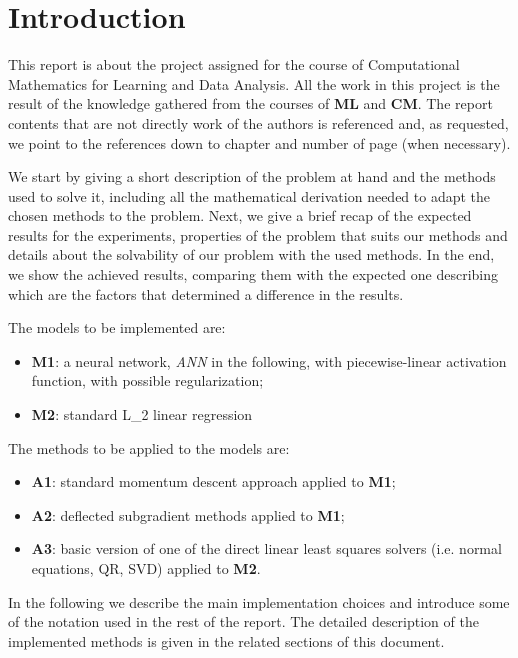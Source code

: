 \section{Introduction}
\label{sec:intro}
This report is about the project assigned for the course of Computational Mathematics for Learning and Data Analysis. All the work in this project is the result of the knowledge gathered from the courses of \textbf{ML} and \textbf{CM}. The report contents that are not directly work of the authors is referenced and, as requested, we point to the references down to chapter and number of page (when necessary).

We start by giving a short description of the problem at hand and the methods used to solve it, including all the mathematical derivation needed to adapt the chosen methods to the problem. Next, we give a brief recap of the expected results for the experiments, properties of the problem that suits our methods and details about the solvability of our problem with the used methods. In the end, we show the achieved results, comparing them with the expected one describing which are the factors that determined a difference in the results.

The models to be implemented are:
\begin{itemize}
    \item \textbf{M1}: a neural network, \textit{ANN} in the following, with piecewise-linear activation function, with possible regularization;
    \item \textbf{M2}: standard L\_2 linear regression
\end{itemize}
The methods to be applied to the models are:
\begin{itemize}
    \item \textbf{A1}: standard momentum descent approach applied to \textbf{M1};
    \item \textbf{A2}: deflected subgradient methods applied to \textbf{M1};
    \item \textbf{A3}: basic version of one of the direct linear least squares solvers (i.e. normal equations, QR, SVD) applied to \textbf{M2}.
\end{itemize}
In the following we describe the main implementation choices and introduce some of the notation used in the rest of the report. The detailed description of the implemented methods is given in the related sections of this document.
